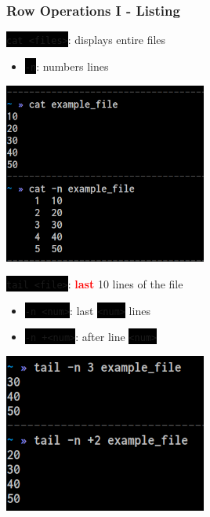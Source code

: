 \documentclass[unknownkeysallowed, 10pt, a4 paper, handout]{beamer}
\newcommand{\focus}[1]{\textbf{\textcolor{red}{#1}}}
\newcommand{\code}[1]{\colorbox{black}{\color{green}\texttt{#1}}}
\newcommand{\sidebyside}[5]{
  \begin{minipage}{#1\textwidth}
    #2
  \end{minipage} #3 \begin{minipage}{#4\textwidth}
    #5
  \end{minipage}
}
\begin{document}
\begin{frame}
  \begin{center}
    \frametitle{Row Operations I - Listing}

    \sidebyside{0.53}{
      \code{cat <files>}: displays entire files
      \begin{itemize}
        \item \code{-n}: numbers lines
      \end{itemize}
    }{\hfill}{0.44}{
      \begin{center}
        \includegraphics[width=0.50\textwidth]{pics/cat.png}
      \end{center}
    }

    \sidebyside{0.53}{
      \code{tail <file>}: \focus{last} 10 lines of the file
      \vspace{-4mm}
        \begin{itemize}
          \item \code{-n <num>}: last \code{<num>} lines
          \item \code{-n +<num>}: after line \code{<num>}
        \end{itemize}
      }{\hfill}{0.44}{
        \begin{center}
          \includegraphics[width=0.50\textwidth]{pics/tail.png}
        \end{center}
      }


\end{center}
\end{frame}
\end{document}
